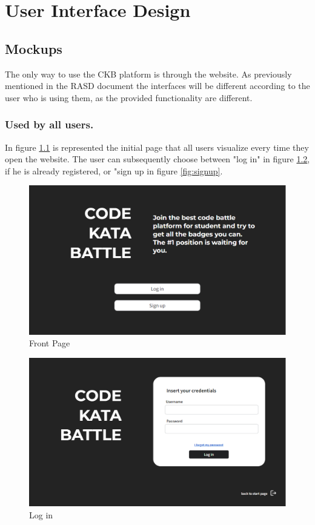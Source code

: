 \chapter{User Interface Design}
\section{Mockups}
The only way to use the CKB platform is through the website. As previously mentioned in the RASD document the interfaces will be different according to the user who is using them, as the provided functionality are different. 

\subsection*{Used by all users.}
In figure \ref{fig:frontPage} is represented the initial page that all users visualize every time they open the website. The user can subsequently choose between "log in" in figure \ref{fig:login}, if he is already registered, or "sign up in figure \ref{fig:signup}.
\begin{figure}[h]
    \centering
    \includegraphics[width=\textwidth]{images/mockups/FrontPage.png}
    \caption{Front Page}
    \label{fig:frontPage}
\end{figure}
                                                                                
\begin{figure}[h]
    \centering
    \includegraphics[width=\textwidth]{images/mockups/Login.png}
    \caption{Log in}
    \label{fig:login}
\end{figure}

